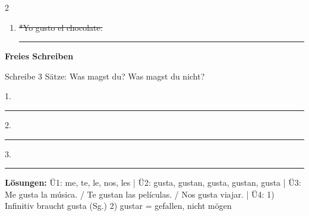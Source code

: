 \documentclass[10pt, a4paper]{article}
\newcommand{\fachfarbe}{spanisch}
\newcommand{\luecke}[1]{\rule{#1}{0.4pt}}
\newcommand{\abschnitt}[1]{%
    \vspace{8pt}
    \noindent\textbf{\textcolor{\fachfarbe}{#1}}
    \vspace{4pt}
}
\begin{document}
\begin{multicols}{2}
\begin{enumerate}[leftmargin=2em]
\luecke{5cm}

\vspace{2pt}

\item \textcolor{fehler}{\sout{*Yo gusto el chocolate.}}

\luecke{5cm}

\end{enumerate}

\vspace{6pt}


\abschnitt{Freies Schreiben}

Schreibe 3 Sätze: Was magst du? Was magst du nicht?

\vspace{4pt}

1. \luecke{5.5cm}

\vspace{6pt}

2. \luecke{5.5cm}

\vspace{6pt}

3. \luecke{5.5cm}

\vspace{8pt}


{\scriptsize\textcolor{grau}{
\textbf{Lösungen:}
Ü1: me, te, le, nos, les |
Ü2: gusta, gustan, gusta, gustan, gusta |
Ü3: Me gusta la música. / Te gustan las películas. / Nos gusta viajar. |
Ü4: 1) Infinitiv braucht gusta (Sg.) 2) gustar = gefallen, nicht mögen
}}

\end{multicols}
\end{document}
